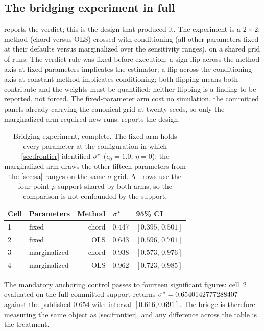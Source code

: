 \subsection{The bridging experiment in full}
\label{app:bridge}

 reports the verdict; this is the design that produced it.
The experiment is a $2\times2$: method (chord versus OLS) crossed with
conditioning (all other parameters fixed at their defaults versus marginalized
over the sensitivity ranges), on a shared grid of runs. The verdict rule was
fixed before execution: a sign flip across the method axis at fixed
parameters implicates the estimator; a flip across the conditioning axis at
constant method implicates conditioning; both flipping means both contribute
and the weights must be quantified; neither flipping is a finding to be
reported, not forced. The fixed-parameter arm cost no simulation, the committed
panels already carrying the canonical grid at twenty seeds, so only the
marginalized arm required new runs.  reports the design.

\begin{table}[htbp]
\centering
\small
\caption{Bridging experiment, complete. The fixed arm holds every parameter at
the configuration in which \cref{sec:frontier} identified $\sigma^{\ast}$
($c_0 = 1.0$, $\eta = 0$); the marginalized arm draws the other fifteen
parameters from the \cref{sec:sa} ranges on the same $\sigma$ grid. All rows
use the four-point $\rho$ support shared by both arms, so the comparison is not
confounded by the support.}
\label{tab:bridge}
\begin{tabular}{llrll}
\toprule
Cell & Parameters & Method & $\sigma^{\ast}$ & 95\% CI\\
\midrule
1 & fixed        & chord & 0.447 & $[0.395,\,0.501]$\\
2 & fixed        & OLS   & 0.643 & $[0.596,\,0.701]$\\
3 & marginalized & chord & 0.938 & $[0.573,\,0.976]$\\
4 & marginalized & OLS   & 0.962 & $[0.723,\,0.985]$\\
\bottomrule
\end{tabular}
\end{table}

The mandatory anchoring control passes to fourteen significant figures: cell~2
evaluated on the full committed support returns
$\sigma^{\ast} = 0.6540142777288407$ against the published $0.654$ with interval
$[0.616, 0.691]$. The bridge is therefore measuring the same object as
\cref{sec:frontier}, and any difference across the table is the treatment.

